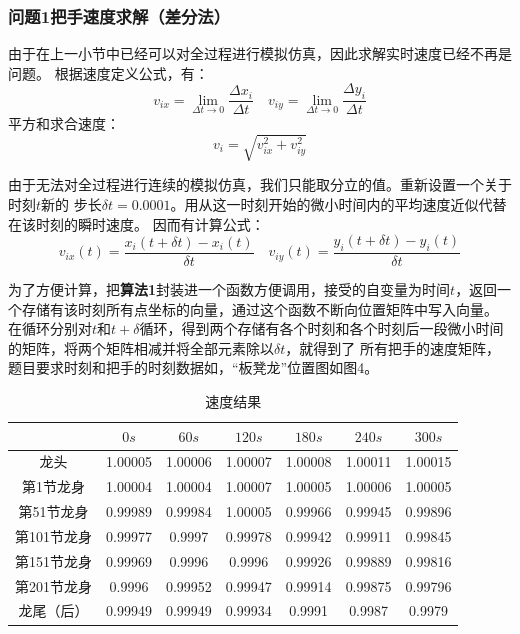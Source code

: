 \documentclass{cumcmthesis1}
\begin{document}
\subsubsection{\textbf{问题1}把手速度求解（差分法）}
由于在上一小节中已经可以对全过程进行模拟仿真，因此求解实时速度已经不再是问题。
根据速度定义公式，有：
\begin{equation}
    v_{ix}=\lim_{\Delta t \to 0}  \frac{\Delta x_i}{\Delta t} \quad v_{iy}=\lim_{\Delta t \to 0}  \frac{\Delta y_i}{\Delta t} 
\end{equation}
平方和求合速度：
\begin{equation}
    v_{i}=\sqrt{v_{ix}^2+v_{iy}^2}
\end{equation}
\par
由于无法对全过程进行连续的模拟仿真，我们只能取分立的值。重新设置一个关于时刻$t$新的
步长$ \delta t=0.0001$。用从这一时刻开始的微小时间内的平均速度近似代替在该时刻的瞬时速度。
因而有计算公式：
\begin{equation}
    v_{ix}(t)= \frac{ x_i(t+\delta t)-x_i(t)}{\delta t} \quad v_{iy}(t)= \frac{ y_i(t+\delta t)-y_i(t)}{\delta t} 
\end{equation}
\par
为了方便计算，把\textbf{算法1}封装进一个函数方便调用，接受的自变量为时间$t$，返回一个存储有该时刻所有点坐标的向量，通过这个函数不断向位置矩阵中写入向量。
在循环分别对$t$和$t+\delta$循环，得到两个存储有各个时刻和各个时刻后一段微小时间的矩阵，将两个矩阵相减并将全部元素除以$\delta t$，就得到了
所有把手的速度矩阵，题目要求时刻和把手的时刻数据如，“板凳龙”位置图如图4。



\begin{table}[h!]
    \caption{速度结果}
    \centering
    \begin{tabular}{|c|c|c|c|c|c|c|}
    \hline
     & $0s$ & $60s$ & $120s$ & $180s$ & $240s$ & $300s$ \\
    \hline
    龙头 & 1.00005& 1.00006&1.00007&1.00008&1.00011&1.00015\\
    \hline
     第1节龙身& 1.00004 & 1.00004 & 1.00007 & 1.00005& 1.00006 & 1.00005 \\
    \hline
     第51节龙身& 0.99989 & 0.99984 & 1.00005 & 0.99966 &0.99945 & 0.99896 \\
    \hline
     第101节龙身& 0.99977 & 0.9997 & 0.99978 & 0.99942 & 0.99911 & 0.99845 \\
    \hline
     第151节龙身& 0.99969 &0.9996  &0.9996  & 0.99926 & 0.99889& 0.99816 \\
    \hline
     第201节龙身& 0.9996 & 0.99952 & 0.99947 & 0.99914 & 0.99875 & 0.99796 \\
    \hline
     龙尾（后）& 0.99949 & 0.99949 & 0.99934 & 0.9991 & 0.9987 & 0.9979\\
    \hline
    \end{tabular}
    \label{tab:example}
\end{table}
\end{document}
